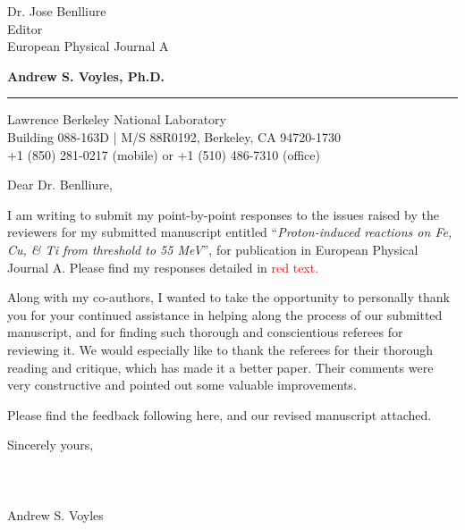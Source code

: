 \documentclass{letter} %
\newcommand{\colornote}[1]{\textcolor{red}{#1}}
\begin{document}
\signature{Andrew S. Voyles}           %
\longindentation=0pt                       %
\let\raggedleft\raggedright                %
 
 
\begin{letter}{Dr. Jose Benlliure \\
Editor \\
European Physical Journal A}


\begin{flushleft}
{\large\bf Andrew S. Voyles, Ph.D.}
\end{flushleft}
\medskip\hrule height 1pt
\begin{flushright}
\hfill Lawrence Berkeley National Laboratory \\
\hfill Building 088-163D  |  M/S 88R0192, Berkeley, CA  94720-1730 \\
\hfill  +1 (850) 281-0217 (mobile) or +1 (510) 486-7310 (office) 
\end{flushright} 
\vfill %

 
\opening{Dear Dr. Benlliure,} 

  \renewcommand*{\thefootnote}{\alph{footnote}}

  \noindent I am writing to submit my point-by-point responses to the issues raised by the reviewers for my submitted manuscript entitled \enquote{\emph{Proton-induced reactions on Fe, Cu, \& Ti from threshold to 55 MeV}},  for publication in European Physical Journal A.  Please find my responses detailed in \colornote{red text.}
  
  \noindent Along with my co-authors, I wanted to take the opportunity to personally thank you for your continued assistance in helping along the process of our submitted manuscript, and for finding such thorough and conscientious referees for reviewing it.  We would especially like to thank the referees for their thorough reading and critique, which has made it a better paper. Their comments were very constructive and pointed out some valuable improvements.
  
  Please find the feedback following here, and our revised manuscript attached. 
  
  Sincerely yours,\\ \\ \\ \\ Andrew S. Voyles
 

\end{letter}
\end{document}
